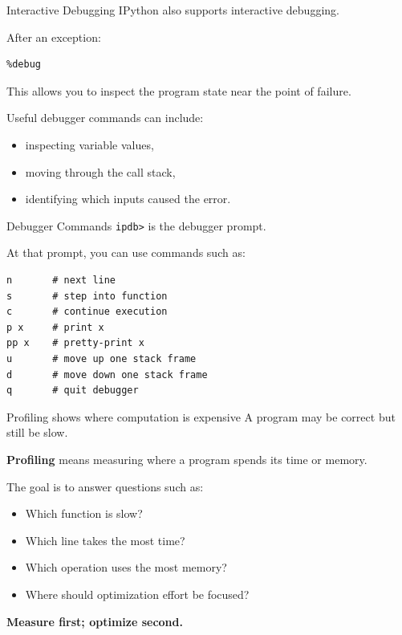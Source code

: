 \documentclass[11pt,aspectratio=43]{beamer}
\begin{document}
\begin{frame}[fragile]{Interactive Debugging}
IPython also supports interactive debugging.

After an exception:

\begin{lstlisting}
%debug
\end{lstlisting}

This allows you to inspect the program state near the point of failure.

Useful debugger commands can include:
\begin{itemize}
  \item inspecting variable values,
  \item moving through the call stack,
  \item identifying which inputs caused the error.
\end{itemize}
\end{frame}

\begin{frame}[fragile]{Debugger Commands}
\texttt{ipdb>} is the debugger prompt.

At that prompt, you can use commands such as:

\begin{lstlisting}
n       # next line
s       # step into function
c       # continue execution
p x     # print x
pp x    # pretty-print x
u       # move up one stack frame
d       # move down one stack frame
q       # quit debugger
\end{lstlisting}
\end{frame}

\begin{frame}{Profiling shows where computation is expensive}
A program may be correct but still be slow.

\vspace{0.3cm}
\textbf{Profiling} means measuring where a program spends its time or memory.

\vspace{0.3cm}
The goal is to answer questions such as:
\begin{itemize}
  \item Which function is slow?
  \item Which line takes the most time?
  \item Which operation uses the most memory?
  \item Where should optimization effort be focused?
\end{itemize}

\vspace{0.3cm}
\textbf{Measure first; optimize second.}
\end{frame}
\end{document}
